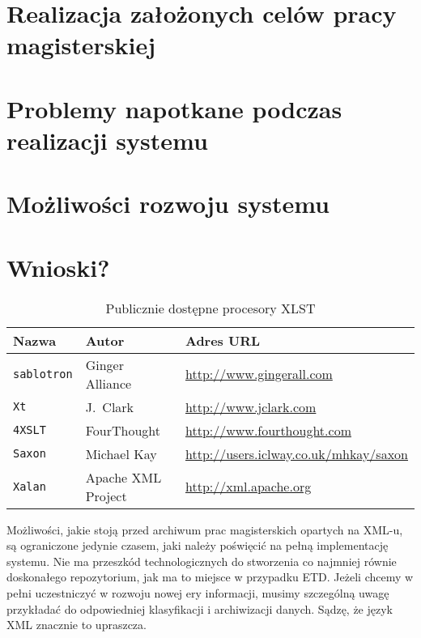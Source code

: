 \documentclass[brudnopis]{xmgr}
\begin{document}
\section{Realizacja założonych celów pracy magisterskiej}
\section {Problemy napotkane podczas realizacji systemu}
\section{Możliwości rozwoju systemu}
\section{Wnioski?}



\begin{table}[!htb]
\begin{tabular}{|l|l|l|} \hline
Nazwa & Autor      & Adres URL \\ \hline
\texttt{sablotron} & Ginger Alliance & \url{http://www.gingerall.com} \\ \hline
\texttt{Xt}        & J.~Clark & \url{http://www.jclark.com} \\ \hline
\texttt{4XSLT}     & FourThought & \url{http://www.fourthought.com} \\ \hline
\texttt{Saxon}     & Michael Kay &  \url{http://users.iclway.co.uk/mhkay/saxon} \\ \hline
\texttt{Xalan}     & Apache XML Project & \url{http://xml.apache.org} \\ \hline
\end{tabular}
\caption{Publicznie dostępne procesory XLST\label{zest:proces:xslt}}
\end{table}


\summary
Możliwości, jakie stoją przed archiwum prac magisterskich opartych na
XML-u, są ograniczone jedynie czasem, jaki należy poświęcić na pełną
implementację systemu. Nie ma przeszkód technologicznych do stworzenia
co najmniej równie doskonałego repozytorium, jak ma to miejsce w
przypadku ETD. Jeżeli chcemy w pełni uczestniczyć w rozwoju nowej ery
informacji, musimy szczególną uwagę przykładać do odpowiedniej
klasyfikacji i archiwizacji danych. Sądzę, że język XML znacznie to
upraszcza.






\listoftables

\listoffigures

\oswiadczenie
\end{document}
